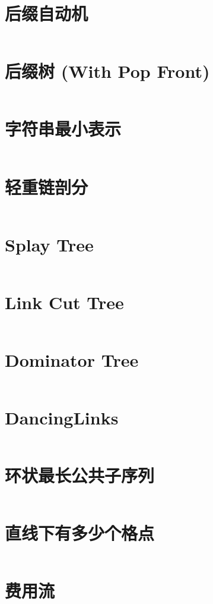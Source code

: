 \documentclass[titlepage,landscape,a4paper,10pt]{article}
\begin{document}
\begin{multicols}{2}
\begin{spacing}{0.8}
\section{后缀自动机}
\inputminted{cpp}{src/后缀自动机.cpp}

\section{后缀树 (With Pop Front)}
\inputminted{cpp}{improve/SuffixTree2.cpp}

\section{字符串最小表示}
\inputminted{cpp}{src/字符串最小表示.cpp}

\section{轻重链剖分}
\inputminted{cpp}{src/轻重链剖分.cpp}

\section{Splay Tree}
\inputminted{cpp}{src/Splay.cpp}

\section{Link Cut Tree}
\inputminted{cpp}{improve/LCT.cpp}

\section{Dominator Tree}
\inputminted{cpp}{improve/DominatorTree.cpp}

\section{DancingLinks}
\inputminted{cpp}{src/DancingLinks.cpp}

\section{环状最长公共子序列}
\inputminted{cpp}{improve/CycleLongest.cpp}

\section{直线下有多少个格点}
\inputminted{cpp}{src/直线下格点统计.cpp}

\section{费用流}
\inputminted{cpp}{improve/MincostFlow.cpp}

\end{spacing}
\end{multicols}
\end{document}
